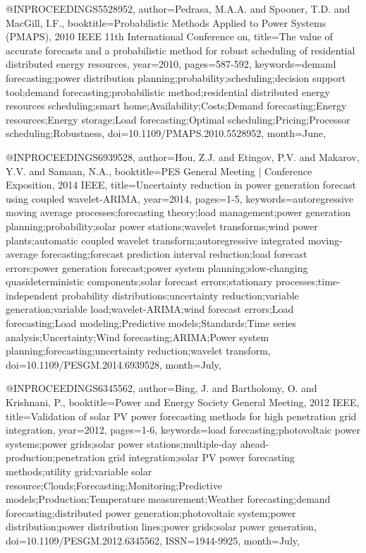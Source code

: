{@INPROCEEDINGS{5528952, 
author={Pedrasa, M.A.A. and Spooner, T.D. and MacGill, I.F.}, 
booktitle={Probabilistic Methods Applied to Power Systems (PMAPS), 2010 IEEE 11th International Conference on}, 
title={The value of accurate forecasts and a probabilistic method for robust scheduling of residential distributed energy resources}, 
year={2010}, 
pages={587-592}, 
keywords={demand forecasting;power distribution planning;probability;scheduling;decision support tool;demand forecasting;probabilistic method;residential distributed energy resources scheduling;smart home;Availability;Costs;Demand forecasting;Energy resources;Energy storage;Load forecasting;Optimal scheduling;Pricing;Processor scheduling;Robustness}, 
doi={10.1109/PMAPS.2010.5528952}, 
month={June},}

@INPROCEEDINGS{6939528, 
author={Hou, Z.J. and Etingov, P.V. and Makarov, Y.V. and Samaan, N.A.}, 
booktitle={PES General Meeting | Conference Exposition, 2014 IEEE}, 
title={Uncertainty reduction in power generation forecast using coupled wavelet-ARIMA}, 
year={2014}, 
pages={1-5}, 
keywords={autoregressive moving average processes;forecasting theory;load management;power generation planning;probability;solar power stations;wavelet transforms;wind power plants;automatic coupled wavelet transform;autoregressive integrated moving-average forecasting;forecast prediction interval reduction;load forecast errors;power generation forecast;power system planning;slow-changing quasideterministic components;solar forecast errors;stationary processes;time-independent probability distributions;uncertainty reduction;variable generation;variable load;wavelet-ARIMA;wind forecast errors;Load forecasting;Load modeling;Predictive models;Standards;Time series analysis;Uncertainty;Wind forecasting;ARIMA;Power system planning;forecasting;uncertainty reduction;wavelet transform}, 
doi={10.1109/PESGM.2014.6939528}, 
month={July},}

@INPROCEEDINGS{6345562, 
author={Bing, J. and Bartholomy, O. and Krishnani, P.}, 
booktitle={Power and Energy Society General Meeting, 2012 IEEE}, 
title={Validation of solar PV power forecasting methods for high penetration grid integration}, 
year={2012}, 
pages={1-6}, 
keywords={load forecasting;photovoltaic power systems;power grids;solar power stations;multiple-day ahead-production;penetration grid integration;solar PV power forecasting methods;utility grid;variable solar resource;Clouds;Forecasting;Monitoring;Predictive models;Production;Temperature measurement;Weather forecasting;demand forecasting;distributed power generation;photovoltaic system;power distribution;power distribution lines;power grids;solar power generation}, 
doi={10.1109/PESGM.2012.6345562}, 
ISSN={1944-9925}, 
month={July},}

}
